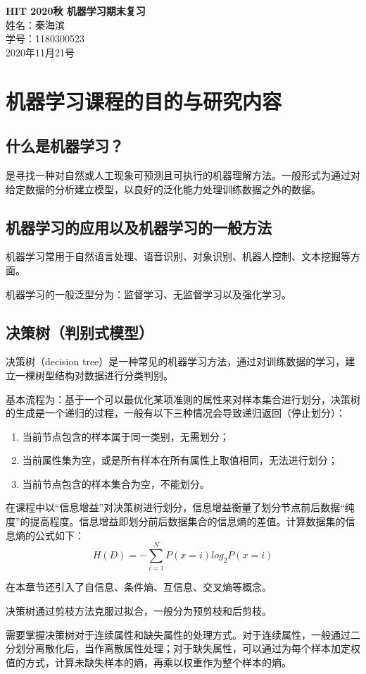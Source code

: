\documentclass[12pt]{article}
\begin{document}
 
\begin{titlepage}
\begin{center}      
{\Huge \bfseries HIT 2020秋 机器学习期末复习}\\[1cm]
{\Large 姓名：秦海滨}\\[1cm]
{\Large 学号：1180300523}\\[8cm]
{\Large 2020年11月21号}
\end{center}
\end{titlepage}
\newpage
\tableofcontents
\newpage
\section{机器学习课程的目的与研究内容}
\subsection{什么是机器学习？}
是寻找一种对自然或人工现象可预测且可执行的机器理解方法。一般形式为通过对给定数据的分析建立模型，以良好的泛化能力处理训练数据之外的数据。
\subsection{机器学习的应用以及机器学习的一般方法}
机器学习常用于自然语言处理、语音识别、对象识别、机器人控制、文本挖掘等方面。\par
机器学习的一般泛型分为：监督学习、无监督学习以及强化学习。\par
\subsection{决策树（判别式模型）}
决策树（decision tree）是一种常见的机器学习方法，通过对训练数据的学习，建立一棵树型结构对数据进行分类判别。\par
基本流程为：基于一个可以最优化某项准则的属性来对样本集合进行划分，决策树的生成是一个递归的过程，一般有以下三种情况会导致递归返回（停止划分）：\par
\begin{enumerate}
    \item 当前节点包含的样本属于同一类别，无需划分；
    \item 当前属性集为空，或是所有样本在所有属性上取值相同，无法进行划分；
    \item 当前节点包含的样本集合为空，不能划分。
\end{enumerate}\par
在课程中以“信息增益”对决策树进行划分，信息增益衡量了划分节点前后数据“纯度”的提高程度。信息增益即划分前后数据集合的信息熵的差值。计算数据集的信息熵的公式如下：
\[H(D)=-\sum_{i=1}^NP(x=i){log}_2P(x=i)\]\par
在本章节还引入了自信息、条件熵、互信息、交叉熵等概念。\par
决策树通过剪枝方法克服过拟合，一般分为预剪枝和后剪枝。\par
需要掌握决策树对于连续属性和缺失属性的处理方式。对于连续属性，一般通过二分划分离散化后，当作离散属性处理；对于缺失属性，可以通过为每个样本加定权值的方式，计算未缺失样本的熵，再乘以权重作为整个样本的熵。\par
\end{document}
